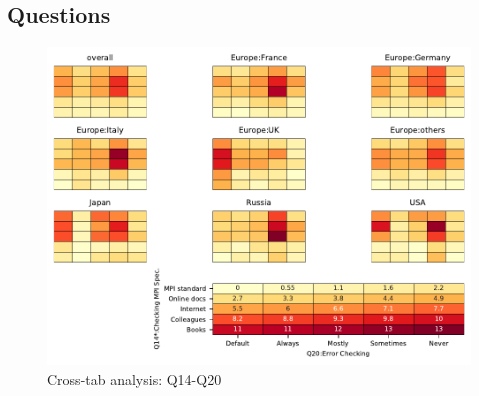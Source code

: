 
\subsection{Questions}


\begin{figure}
\begin{center}
\includegraphics[width=12cm]{../pdfs/Q14-Q20.pdf}
\caption{Cross-tab analysis: Q14-Q20}
\label{fig:Q14-Q20}
\end{center}
\end{figure}
